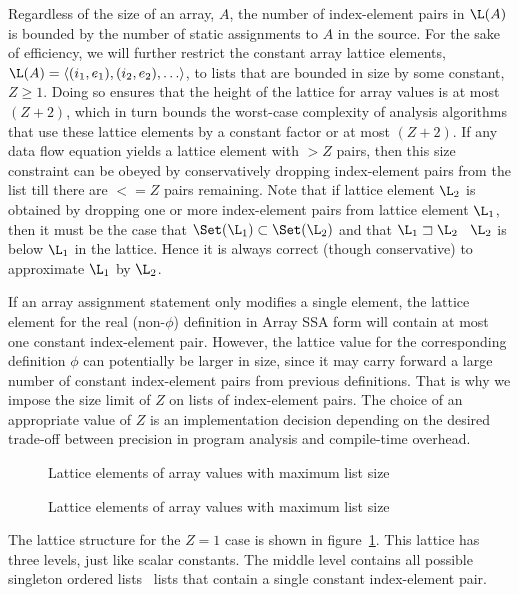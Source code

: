 Regardless of the size of an array, $A$, the number
of index-element pairs in  $\L(A)$ is bounded by the number of
static assignments to $A$ in the source. 
For the sake of efficiency, we will further restrict the constant array lattice
elements, $\L(A) = \langle(i_1,e_1), (i_2,e_2), \ldots\rangle$,
to lists that are bounded in size by some constant, $Z\geq 1$.
Doing so ensures
that the height of the lattice for array values is at most $(Z+2)$,
which in turn bounds the worst-case complexity of analysis algorithms
that use these lattice elements by a constant factor or at most $(Z+2)$.
If any data flow equation yields a lattice element with $>Z$ pairs, then
this size constraint can be obeyed by conservatively dropping 
index-element pairs
from the list till there are $<= Z$ pairs remaining.  Note that if
lattice element $\L_2$ is obtained by dropping one or more index-element pairs
from lattice element $\L_1$, then it must be the case that 
$\Set(\L_1) \subset \Set(\L_2)$ and that $\L_1  \sqsupset \L_2$ \ie\ 
$\L_2$ is below $\L_1$ in the lattice.  Hence it is always correct (though
conservative) to approximate $\L_1$ by $\L_2$.


If an array assignment statement only modifies a single element, the
lattice element for the real (non-$\phi$) definition in Array SSA form
will contain at most one constant
index-element pair.  However, the lattice
value for the corresponding definition $\phi$ can potentially be
larger in size, since it may carry forward a large number of constant
index-element pairs from previous definitions.  That is why we impose
the size limit of $Z$ on lists of index-element pairs.  The choice of
an appropriate value of $Z$ is an implementation decision depending on the
desired trade-off between precision in program analysis and compile-time
overhead.


\begin{figure}%
\centerline{}
\caption{Lattice elements of array values with maximum list size }
\label{fig:array1}
\end{figure}

\begin{figure}%
\centerline{}
\caption{Lattice elements of array values with maximum list size }
\label{fig:array2}
\end{figure}

The lattice structure for the $Z=1$ case is shown in figure~\ref{fig:array1}.  This lattice has three levels, just like scalar constants.  The middle level contains all possible singleton
ordered lists \ie\ lists  that contain a single constant index-element pair.

